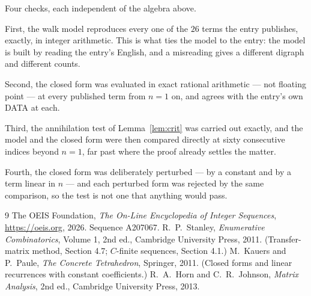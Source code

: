 \documentclass[11pt,a4paper]{article}
\theoremstyle{plain}
\theoremstyle{definition}
\begin{document}
Four checks, each independent of the algebra above.

First, the walk model reproduces every one of the $26$ terms the entry publishes,
exactly, in integer arithmetic. This is what ties the model to the entry: the model is built
by reading the entry's English, and a misreading gives a different digraph and different
counts.

Second, the closed form was evaluated in exact rational arithmetic --- not floating point ---
at every published term from $n=1$ on, and agrees with the entry's own DATA at each.

Third, the annihilation test of Lemma~\ref{lem:crit} was carried out exactly, and the model
and the closed form were then compared directly at sixty consecutive indices beyond
$n=1$, far past where the proof already settles the matter.

Fourth, the closed form was deliberately perturbed --- by a constant and by a term linear in
$n$ --- and each perturbed form was rejected by the same comparison, so the test is not one
that anything would pass.

\begin{thebibliography}{9}
 The OEIS Foundation, \emph{The On-Line Encyclopedia of Integer
Sequences}, \url{https://oeis.org}, 2026. Sequence A207067.
 R.~P.~Stanley, \emph{Enumerative Combinatorics}, Volume 1, 2nd ed.,
Cambridge University Press, 2011. (Transfer-matrix method, Section 4.7; $C$-finite sequences,
Section 4.1.)
 M.~Kauers and P.~Paule, \emph{The Concrete Tetrahedron}, Springer, 2011.
(Closed forms and linear recurrences with constant coefficients.)
 R.~A.~Horn and C.~R.~Johnson, \emph{Matrix Analysis}, 2nd ed., Cambridge
University Press, 2013.
\end{thebibliography}
\end{document}
